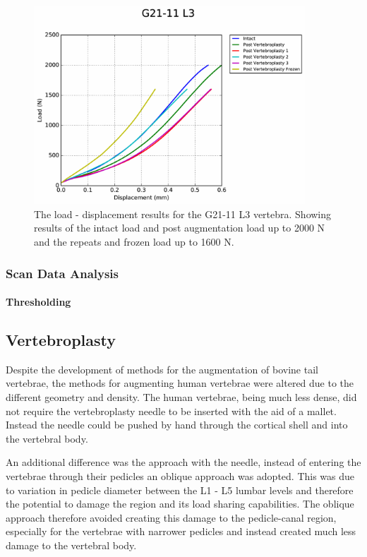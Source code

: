 \begin{figure}[ht]
\centering
\includegraphics[width=4in]{Chapters/Chapter_HT_images/G21-11_L3.pdf}
\caption{The load - displacement results for the G21-11 L3 vertebra. Showing results of the intact load and post augmentation load up to 2000 N and the repeats and frozen load up to 1600 N.}
\label{fig:G21-11_L3}
\end{figure}



\subsubsection{Scan Data Analysis}

\paragraph{Thresholding}


\subsection{Vertebroplasty}

Despite the development of methods for the augmentation of bovine tail vertebrae, the methods for augmenting human vertebrae were altered due to the different geometry and density.
The human vertebrae, being much less dense, did not require the vertebroplasty needle to be inserted with the aid of a mallet.
Instead the needle could be pushed by hand through the cortical shell and into the vertebral body.

An additional difference was the approach with the needle, instead of entering
the vertebrae through their pedicles an oblique approach was adopted.
This was due to variation in pedicle diameter between the L1 - L5 lumbar levels and therefore the potential to damage the region and its load sharing capabilities.
The oblique approach therefore avoided creating this damage to the pedicle-canal region, especially for the vertebrae with narrower pedicles and instead created much less damage to the vertebral body.

